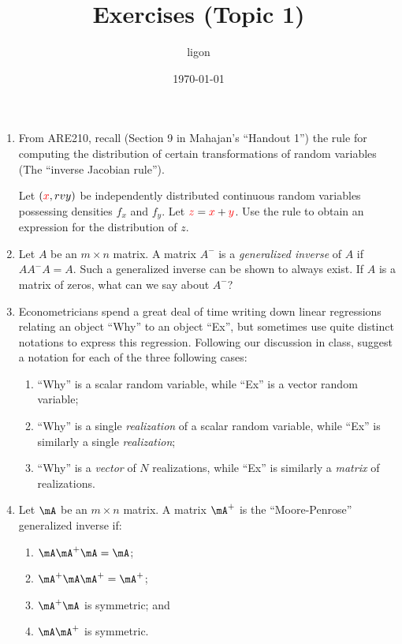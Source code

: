 \documentclass[12pt]{amsart}
\author{ligon}
\date{\today}
\title{Exercises (Topic 1)}
\newcommand{\rv}[1]{\ensuremath{\textcolor{red}{#1}{}}}
\newcommand{\rvy}{\rv{y}}
\newcommand{\rvx}{\rv{x}}
\begin{document}
\maketitle
\tableofcontents

\begin{enumerate}
\item From ARE210, recall (Section 9 in Mahajan's ``Handout 1'') the rule for
computing the distribution of certain transformations of random
variables (The ``inverse Jacobian rule'').

Let \((\rvx,rvy)\) be independently distributed continuous random
variables possessing densities \(f_x\) and \(f_y\).  Let \(\rv{z} = \rvx +
      \rvy\).  Use the rule to obtain an expression for the distribution
of \(z\).

\item Let \(A\) be an \(m\times n\) matrix.  A matrix \(A^-\) is a
\emph{generalized inverse} of \(A\) if \(AA^-A=A\).  Such a generalized
inverse can be shown to always exist.  If \(A\) is a matrix
of zeros, what can we say about \(A^-\)?

\item Econometricians spend a great deal of time writing down
linear regressions relating an object ``Why'' to an object ``Ex'', but
sometimes use quite distinct notations to express this
regression.  Following our discussion in class, suggest a
notation for each of the three following cases:

\begin{enumerate}
\item ``Why'' is a scalar random variable, while ``Ex'' is a vector
random variable;

\item ``Why'' is a single \emph{realization} of a scalar random variable,
while ``Ex'' is similarly a single \emph{realization};

\item ``Why'' is a \emph{vector} of \(N\) realizations, while ``Ex'' is
similarly a \emph{matrix} of realizations.
\end{enumerate}

\item Let \(\mA\) be an \(m\times n\) matrix.  A matrix \(\mA^+\) is the
``Moore-Penrose'' generalized inverse if:

\begin{enumerate}
\item \(\mA\mA^+\mA = \mA\);
\item \(\mA^+\mA\mA^+ = \mA^+\);
\item \(\mA^+\mA\) is symmetric; and
\item \(\mA\mA^+\) is symmetric.
\end{enumerate}


\end{enumerate}
\end{document}

